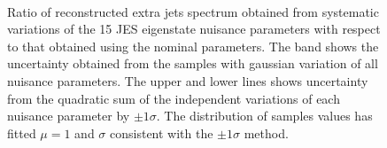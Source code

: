 \begin{figure}
~
~
\caption{Ratio of reconstructed extra jets spectrum obtained from systematic variations of the 15 JES eigenstate nuisance parameters with respect to that obtained using the nominal parameters. The band shows the uncertainty obtained from the samples with gaussian variation of all nuisance parameters. The upper and lower lines shows uncertainty from the quadratic sum of the independent variations of each nuisance parameter by $\pm 1 \sigma$. The distribution of samples values has fitted $\mu=1$ and $\sigma$ consistent with the $\pm 1 \sigma$ method. }
\label{fig:ToyJES1}
\end{figure}





